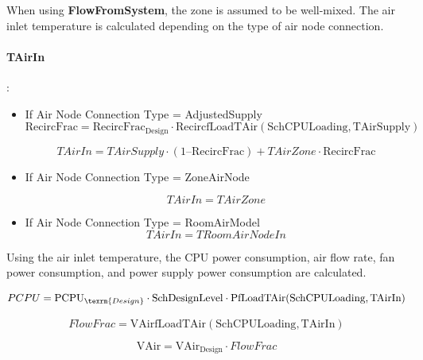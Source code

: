 When using \textbf{FlowFromSystem}, the zone is assumed to be well-mixed. The air inlet temperature is calculated depending on the type of air node connection.

\paragraph{TAirIn}:

\begin{itemize}
    \tightlist
  \item
    If Air Node Connection Type = AdjustedSupply
\begin{equation}
\textrm{RecircFrac} = \textrm{RecircFrac}_{\textrm{Design}} \cdot \textrm{RecircfLoadTAir}(\textrm{SchCPULoading}, \textrm{TAirSupply})
\end{equation}

\begin{equation}
TAirIn = TAirSupply \cdot (1 – \textrm{RecircFrac}) + TAirZone \cdot \textrm{RecircFrac}
\end{equation}

  \item
    If Air Node Connection Type = ZoneAirNode
    
\begin{equation}
TAirIn = TAirZone
\end{equation}

  \item
    If Air Node Connection Type = RoomAirModel
\begin{equation}
TAirIn = TRoomAirNodeIn
\end{equation}

\end{itemize}

Using the air inlet temperature, the CPU power consumption, air flow rate, fan power consumption, and power supply power consumption are calculated.

\begin{equation}
PCPU = \textrm{PCPU}_{\texrm{Design}} \cdot \textrm{SchDesignLevel} \cdot \textrm{PfLoadTAir}(\textrm{SchCPULoading}, \textrm{TAirIn})
\end{equation}

\begin{equation}
FlowFrac = \textrm{VAirfLoadTAir}(\textrm{SchCPULoading}, \textrm{TAirIn})
\end{equation}

\begin{equation}
\textrm{VAir} = \textrm{VAir}_{\textrm{Design}} \cdot FlowFrac
\end{equation}

